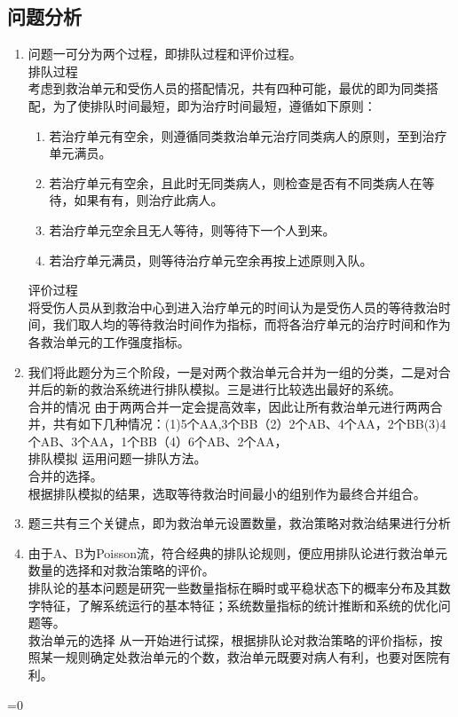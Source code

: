 \documentclass{article}
\begin{document}
\subsection{问题分析}
\begin{enumerate}
	\item 问题一可分为两个过程，即排队过程和评价过程。
	\\排队过程
	\\考虑到救治单元和受伤人员的搭配情况，共有四种可能，最优的即为同类搭配，为了使排队时间最短，即为治疗时间最短，遵循如下原则：
	\begin{enumerate}
		\item 若治疗单元有空余，则遵循同类救治单元治疗同类病人的原则，至到治疗单元满员。
		\item 若治疗单元有空余，且此时无同类病人，则检查是否有不同类病人在等待，如果有有，则治疗此病人。
		\item 若治疗单元空余且无人等待，则等待下一个人到来。
		\item 若治疗单元满员，则等待治疗单元空余再按上述原则入队。
	\end{enumerate}
	\par 评价过程 
	\\将受伤人员从到救治中心到进入治疗单元的时间认为是受伤人员的等待救治时间，我们取人均的等待救治时间作为指标，而将各治疗单元的治疗时间和作为各救治单元的工作强度指标。 
	\item 我们将此题分为三个阶段，一是对两个救治单元合并为一组的分类，二是对合并后的新的救治系统进行排队模拟。三是进行比较选出最好的系统。
	\\合并的情况 由于两两合并一定会提高效率，因此让所有救治单元进行两两合并，共有如下几种情况：(1)5个AA,3个BB（2）2个AB、4个AA，2个BB(3)4个AB、3个AA，1个BB（4）6个AB、2个AA，
	\\排队模拟 运用问题一排队方法。
	\\合并的选择。
	\\根据排队模拟的结果，选取等待救治时间最小的组别作为最终合并组合。
	\item 题三共有三个关键点，即为救治单元设置数量，救治策略对救治结果进行分析
	\item 由于A、B为Poisson流，符合经典的排队论规则，便应用排队论进行救治单元数量的选择和对救治策略的评价。
	\\排队论的基本问题是研究一些数量指标在瞬时或平稳状态下的概率分布及其数字特征，了解系统运行的基本特征；系统数量指标的统计推断和系统的优化问题等。
	\\救治单元的选择 从一开始进行试探，根据排队论对救治策略的评价指标，按照某一规则确定处救治单元的个数，救治单元既要对病人有利，也要对医院有利。
\end{enumerate}
\ifnum{}=0
	
\end{document}
